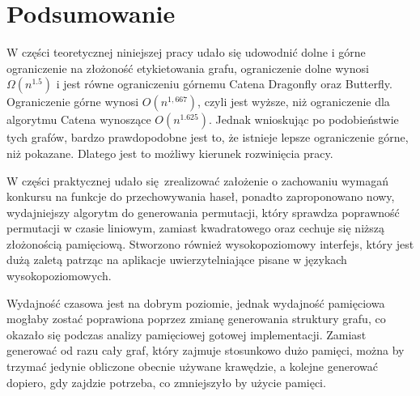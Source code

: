 \chapter{Podsumowanie}
\thispagestyle{chapterBeginStyle}

W części teoretycznej niniejszej pracy udało się udowodnić dolne i górne ograniczenie na złożoność etykietowania grafu, ograniczenie dolne wynosi $\Omega(n^{1.5})$ i jest równe ograniczeniu górnemu Catena Dragonfly oraz Butterfly. Ograniczenie górne wynosi $O(n^{1,667})$, czyli jest wyższe, niż ograniczenie dla algorytmu Catena wynoszące $O(n^{1.625})$. Jednak wnioskując po podobieństwie tych grafów, bardzo prawdopodobne jest to, że istnieje lepsze ograniczenie górne, niż pokazane. Dlatego jest to możliwy kierunek rozwinięcia pracy.

W części praktycznej udało się zrealizować założenie o zachowaniu wymagań konkursu na funkcje do przechowywania haseł, ponadto zaproponowano nowy, wydajniejszy algorytm do generowania permutacji, który sprawdza poprawność permutacji w czasie liniowym, zamiast kwadratowego oraz cechuje się niższą złożonością pamięciową.
Stworzono również wysokopoziomowy interfejs, który jest dużą zaletą patrząc na aplikacje uwierzytelniające pisane w językach wysokopoziomowych.

Wydajność czasowa jest na dobrym poziomie, jednak wydajność pamięciowa mogłaby zostać poprawiona poprzez zmianę generowania struktury grafu, co okazało się podczas analizy pamięciowej gotowej implementacji. Zamiast generować od razu cały graf, który zajmuje stosunkowo dużo pamięci, można by trzymać jedynie obliczone obecnie używane krawędzie, a kolejne generować dopiero, gdy zajdzie potrzeba, co zmniejszyło by użycie pamięci.


